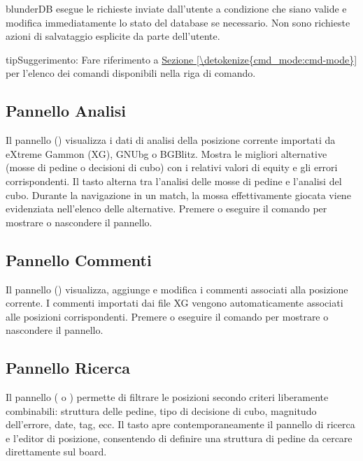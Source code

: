 \documentclass[letterpaper,10pt,italian]{sphinxmanual}
\begin{document}
\sphinxAtStartPar
blunderDB esegue le richieste inviate dall’utente a condizione che siano valide e modifica immediatamente lo stato del database se necessario. Non sono richieste azioni di salvataggio esplicite da parte dell’utente.

\begin{sphinxadmonition}{tip}{Suggerimento:}
\sphinxAtStartPar
Fare riferimento a \hyperref[\detokenize{cmd_mode:cmd-mode}]{Sezione \ref{\detokenize{cmd_mode:cmd-mode}}} per l’elenco dei comandi disponibili nella riga di comando.
\end{sphinxadmonition}


\subsection{Pannello Analisi}
\label{\detokenize{manuel:panneau-analyse}}\label{\detokenize{manuel:id3}}
\sphinxAtStartPar
Il pannello  () visualizza i dati di analisi della posizione corrente importati da eXtreme Gammon (XG), GNUbg o BGBlitz. Mostra le migliori alternative (mosse di pedine o decisioni di cubo) con i relativi valori di equity e gli errori corrispondenti. Il tasto  alterna tra l’analisi delle mosse di pedine e l’analisi del cubo. Durante la navigazione in un match, la mossa effettivamente giocata viene evidenziata nell’elenco delle alternative. Premere  o eseguire il comando  per mostrare o nascondere il pannello.


\subsection{Pannello Commenti}
\label{\detokenize{manuel:panneau-commentaires}}\label{\detokenize{manuel:id4}}
\sphinxAtStartPar
Il pannello  () visualizza, aggiunge e modifica i commenti associati alla posizione corrente. I commenti importati dai file XG vengono automaticamente associati alle posizioni corrispondenti. Premere  o eseguire il comando  per mostrare o nascondere il pannello.


\subsection{Pannello Ricerca}
\label{\detokenize{manuel:panneau-recherche}}\label{\detokenize{manuel:id5}}
\sphinxAtStartPar
Il pannello  ( o ) permette di filtrare le posizioni secondo criteri liberamente combinabili: struttura delle pedine, tipo di decisione di cubo, magnitudo dell’errore, date, tag, ecc. Il tasto  apre contemporaneamente il pannello di ricerca e l’editor di posizione, consentendo di definire una struttura di pedine da cercare direttamente sul board.
\end{document}
